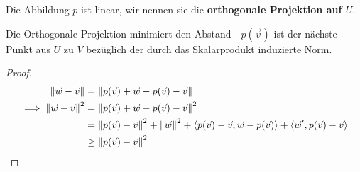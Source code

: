 \documentclass{report}
\newcommand{\tbf}[1]{\textbf{#1}}
\newcommand{\vv}{\vec{v}}
\newcommand{\vw}{\vec{w}}
\newcommand{\scalar}[2]{\left\langle #1, #2 \right\rangle}
\begin{document}
\begin{anmerkung}
 Die Abbildung $p$ ist linear, wir nennen sie die \tbf{orthogonale Projektion auf $U$}.
\end{anmerkung}
\begin{beobachtung}
 Die Orthogonale Projektion minimiert den Abstand - $p(\vv)$ ist der nächste Punkt aus $U$ zu $V$ bezüglich der durch das Skalarprodukt induzierte Norm.
\end{beobachtung}
\begin{proof}
 \begin{align*}
  \norm{\vw - \vv} &= \norm{p(\vv) + \vw - p(\vv) - \vv}\\
  \implies \norm{\vw - \vv}^2 &= \norm{p(\vv) + \vw - p(\vv) - \vv}^2\\
  &= \norm{p(\vv) - \vv}^2 + \norm{\vw}^2 + \scalar{p(\vv) - \vv}{\vw - p(\vv)} + \scalar{\vw'}{p(\vv) - \vv}\\
  &\geq \norm{p(\vv) - \vv}^2
 \end{align*}
\end{proof}

%
%
%
%
%
%
%
%
%
%
%
%
%
\end{document}
